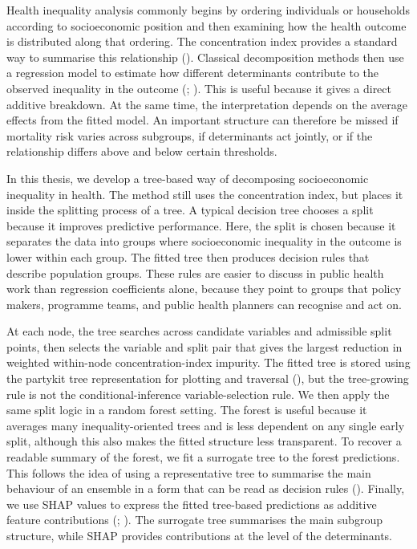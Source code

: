 \documentclass[
  11pt,
  a4paper,
]{article}
\begin{document}
Health inequality analysis commonly begins by ordering individuals or
households according to socioeconomic position and then examining how
the health outcome is distributed along that ordering. The concentration
index provides a standard way to summarise this relationship
(). Classical decomposition methods then use a regression
model to estimate how different determinants contribute to the observed
inequality in the outcome
(; ). This is useful because it gives a direct additive
breakdown. At the same time, the interpretation depends on the average
effects from the fitted model. An important structure can therefore be
missed if mortality risk varies across subgroups, if determinants act
jointly, or if the relationship differs above and below certain
thresholds.

In this thesis, we develop a tree-based way of decomposing socioeconomic
inequality in health. The method still uses the concentration index, but
places it inside the splitting process of a tree. A typical decision
tree chooses a split because it improves predictive performance. Here,
the split is chosen because it separates the data into groups where
socioeconomic inequality in the outcome is lower within each group. The
fitted tree then produces decision rules that describe population
groups. These rules are easier to discuss in public health work than
regression coefficients alone, because they point to groups that policy
makers, programme teams, and public health planners can recognise and
act on.

At each node, the tree searches across candidate variables and
admissible split points, then selects the variable and split pair that
gives the largest reduction in weighted within-node concentration-index
impurity. The fitted tree is stored using the partykit tree
representation for plotting and traversal
(), but the
tree-growing rule is not the conditional-inference variable-selection
rule. We then apply the same split logic in a random forest setting. The
forest is useful because it averages many inequality-oriented trees and
is less dependent on any single early split, although this also makes
the fitted structure less transparent. To recover a readable summary of
the forest, we fit a surrogate tree to the forest predictions. This
follows the idea of using a representative tree to summarise the main
behaviour of an ensemble in a form that can be read as decision rules
(). Finally, we use SHAP values to express the fitted
tree-based predictions as additive feature contributions
(;
). The
surrogate tree summarises the main subgroup structure, while SHAP
provides contributions at the level of the determinants.
\end{document}
